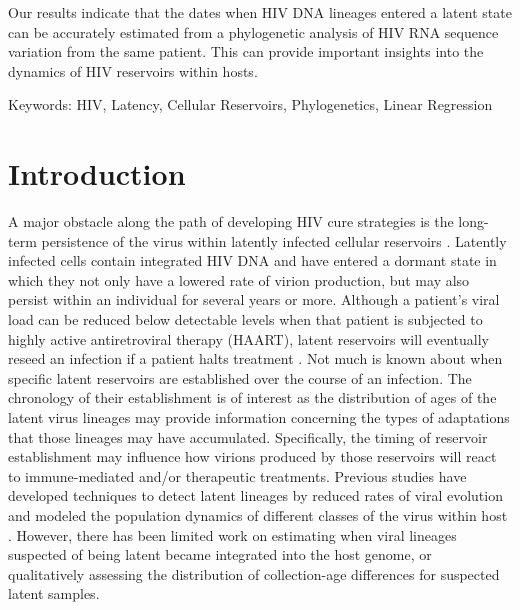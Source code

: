\documentclass[12pt]{article}
\begin{document}
Our results indicate that the dates when HIV DNA lineages entered a latent state can be accurately estimated from a phylogenetic analysis of HIV RNA sequence variation from the same patient.
This can provide important insights into the dynamics of HIV reservoirs within hosts.


Keywords: 
HIV, Latency, Cellular Reservoirs, Phylogenetics, Linear Regression\\



\underline{}
\section * {Introduction} \label{sec:intro}

A major obstacle along the path of developing HIV cure strategies is the long-term persistence of the virus within latently infected cellular reservoirs \citep{Pace11}. 
Latently infected cells contain integrated HIV DNA and have entered a dormant state in which they not only have a lowered rate of virion production, but may also persist within an individual for several years or more.
Although a patient's viral load can be reduced below detectable levels when that patient is subjected to highly active antiretroviral therapy (HAART), latent reservoirs will eventually reseed an infection if a patient halts treatment \citep{Joos08, Pomerantz03, Richman09}. 
Not much is known about when specific latent reservoirs are established over the course of an infection. 
The chronology of their establishment is of interest as the distribution of ages of the latent virus lineages may provide information concerning the types of adaptations that those lineages may have accumulated. 
Specifically, the timing of reservoir establishment may influence how virions produced by those reservoirs will react to immune-mediated and/or therapeutic treatments. 
Previous studies have developed techniques to detect latent lineages by reduced rates of viral evolution \citep{Immonen14} and modeled the population dynamics of different classes of the virus within host \citep{Althaus14}. 
However, there has been limited work on estimating when viral lineages suspected of being latent became integrated into the host genome, or qualitatively assessing the distribution of collection-age differences for suspected latent samples.
\end{document}
